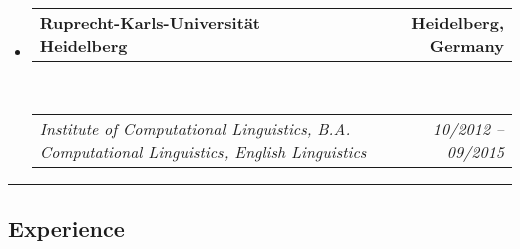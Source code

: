 \documentclass[10pt,letterpaper]{article}
\makeatletter
\newcommand{\headerrow}[2]
{\begin{tabular*}{\linewidth}{l@{\extracolsep{\fill}}r}
	#1 &
	#2 \\
\end{tabular*}}
\makeatother
\begin{document}
\begin{itemize}
	\item 
	\headerrow
		{\textbf{Ruprecht-Karls-Universität Heidelberg}}
		{\textbf{Heidelberg, Germany}}
	\\
	\headerrow
		{\emph{Institute of Computational Linguistics, B.A. Computational Linguistics, English Linguistics}}
		{\emph{10/2012 -- 09/2015}}

\end{itemize}

\hrule
\vspace{-0.4em}
\subsection*{Experience}
\end{document}
